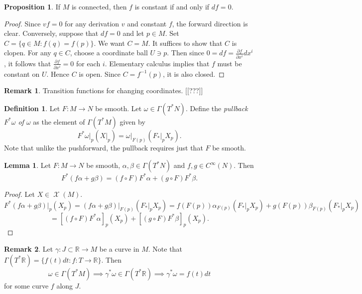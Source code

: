 \documentclass[10pt,letterpaper,cm]{nupset}
\theoremstyle{definition}
\newtheorem*{definition}{Definition}
\newtheorem{remark}{Remark}
\newtheorem{lemma}{Lemma}
\newtheorem{prop}{Proposition}
\newcommand{\R}{\mathbb R}
\newcommand{\1}{\mathbf{1}}
\newcommand{\0}{\vec 0}
\DeclareMathOperator{\vf}{\mathscr{X}}
\begin{document}
\begin{prop}
If $M$ is connected, then $f$ is constant if and only if $df = 0$. 
\end{prop}
\begin{proof}
Since $vf = 0$ for any derivation $v$ and constant $f$, the forward direction is clear. Conversely, suppose that $df = 0$ and let $p\in M$. Set $C = \{q \in M : f(q) = f(p)\}$. We want $C = M$. It suffices to show that $C$ is clopen. For any $q\in C$, choose a coordinate ball $U\ni p$. Then since $0 = df = \frac{\partial{f}}{\partial{x^i}}dx^i$, it follows that $\frac{\partial{f}}{\partial{x^i}} = 0$ for each $i$. Elementary calculus implies that $f$ must be constant on $U$. Hence $C$ is open. Since $C = f^{-1}(p)$, it is also closed.
\end{proof}

\begin{remark}
Transition functions for changing coordinates. {[[???]]}
\end{remark}

\begin{definition}
Let $F: M \to N$ be smooth. Let $\omega \in \Gamma(T^{\ast}N)$. Define the \textit{pullback $F^{\ast}\omega$ of $\omega$}  as the  element of $\Gamma(T^{\ast}M)$ given by $$F^{\ast}\omega \rvert_p (X \rvert_p) = \omega \rvert_{F(p)}(F_{\ast}\rvert_p X_p).$$ Note that unlike the pushforward, the pullback requires just that $F$ be smooth. 
\end{definition}

\begin{lemma}
Let $F: M \to N$ be smooth, $\alpha, \beta \in \Gamma(T^{\ast} N)$ and $f, g \in C^{\infty}(N)$. Then $$F^{\ast}(f \alpha + g \beta) = (f \circ F)F^{\ast} \alpha + (g \circ F)F^{\ast} \beta.$$
\end{lemma}
\begin{proof}
Let $X \in \vf(M)$. $$F^{\ast}(f \alpha + g\beta)\rvert_p(X_p) = (f \alpha + g \beta)\rvert_{F(p)}(F_{\ast}\rvert_p X_p) = 
f(F(p))\alpha_{F(p)}(F_{\ast}\rvert_p  X_p)+ g(F(p))\beta_{F(p)}(F_{\ast}\rvert_p X_p)$$
$$  = [(f\circ F)F^{\ast}\alpha]_p (X_p) + [(g\circ F) F^{\ast}\beta]_p(X_p).
$$
\end{proof}

\begin{remark}
Let $\gamma : J \subset \R \to M$ be a curve in $M$.  Note that $\Gamma(T^{\ast}\R) = \{f(t)dt : f : T \to \R\}$. Then
$$ \omega \in \Gamma(T^{\ast}M) \implies \gamma^{\ast} \omega \in \Gamma(T^{\ast}\R) \implies \gamma^{\ast}\omega = f(t)dt$$ for some curve $f$ along $J$.
\end{remark}
\end{document}
